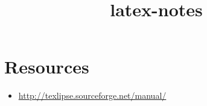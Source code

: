 \documentclass{report}
\title{latex-notes}
\begin{document}
\tableofcontents




\part{Resources}
\begin{itemize}
  \item \url{http://texlipse.sourceforge.net/manual/}
  \end{itemize}
\end{document}
